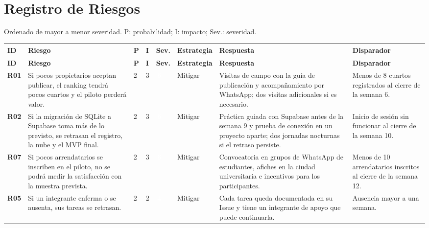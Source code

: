 \documentclass[11pt,a4paper]{article}
\newcommand{\etiqueta}[2]{{\setlength{\fboxsep}{2pt}\colorbox{#1}{\textcolor{white}{\scriptsize\bfseries #2}}}}
\begin{document}
\section{Registro de Riesgos}
Ordenado de mayor a menor severidad. P: probabilidad; I: impacto; Sev.: severidad.

\vspace{0.1cm}
{\footnotesize
\setlength{\tabcolsep}{3pt}
\begin{longtable}{@{}P{0.75cm} >{\raggedright\arraybackslash}p{3.35cm} C{0.45cm} C{0.45cm} C{0.85cm} P{1.45cm} >{\raggedright\arraybackslash}p{3.9cm} >{\raggedright\arraybackslash}p{2.45cm}@{}}
\toprule
{}
\textbf{ID} & \textbf{Riesgo} & \textbf{P} & \textbf{I} & \textbf{Sev.} & \textbf{Estrategia} & \textbf{Respuesta} & \textbf{Disparador} \\
\midrule
\endfirsthead
\toprule
{}
\textbf{ID} & \textbf{Riesgo} & \textbf{P} & \textbf{I} & \textbf{Sev.} & \textbf{Estrategia} & \textbf{Respuesta} & \textbf{Disparador} \\
\midrule
\endhead
\bottomrule
\endfoot
\textbf{R01} & Si pocos propietarios aceptan publicar, el ranking tendrá pocos cuartos y el piloto perderá valor. & 2 & 3 & \etiqueta{SevAlta}{\,6\,} & Mitigar & Visitas de campo con la guía de publicación y acompañamiento por WhatsApp; dos visitas adicionales si es necesario. & Menos de 8 cuartos registrados al cierre de la semana 6. \\
\textbf{R02} & Si la migración de SQLite a Supabase toma más de lo previsto, se retrasan el registro, la nube y el MVP final. & 2 & 3 & \etiqueta{SevAlta}{\,6\,} & Mitigar & Práctica guiada con Supabase antes de la semana 9 y prueba de conexión en un proyecto aparte; dos jornadas nocturnas si el retraso persiste. & Inicio de sesión sin funcionar al cierre de la semana 10. \\
\textbf{R07} & Si pocos arrendatarios se inscriben en el piloto, no se podrá medir la satisfacción con la muestra prevista. & 2 & 3 & \etiqueta{SevAlta}{\,6\,} & Mitigar & Convocatoria en grupos de WhatsApp de estudiantes, afiches en la ciudad universitaria e incentivos para los participantes. & Menos de 10 arrendatarios inscritos al cierre de la semana 12. \\
\textbf{R05} & Si un integrante enferma o se ausenta, sus tareas se retrasan. & 2 & 2 & \etiqueta{SevMedia}{\,4\,} & Mitigar & Cada tarea queda documentada en su Issue y tiene un integrante de apoyo que puede continuarla. & Ausencia mayor a una semana. \\

\end{longtable}}
\end{document}
